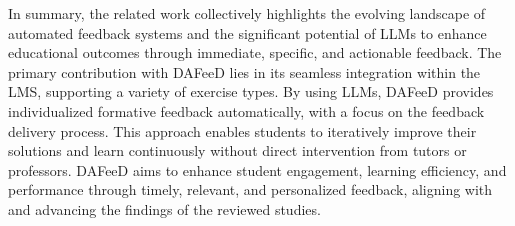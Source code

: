 \documentclass[manuscript,screen,review, anonymous]{acmart}
\begin{document}
In summary, the related work collectively highlights the evolving landscape of automated feedback systems and the significant potential of LLMs to enhance educational outcomes through immediate, specific, and actionable feedback.
The primary contribution with DAFeeD lies in its seamless integration within the LMS, supporting a variety of exercise types.
By using LLMs, DAFeeD provides individualized formative feedback automatically, with a focus on the feedback delivery process.
This approach enables students to iteratively improve their solutions and learn continuously without direct intervention from tutors or professors.
DAFeeD aims to enhance student engagement, learning efficiency, and performance through timely, relevant, and personalized feedback, aligning with and advancing the findings of the reviewed studies.









\end{document}
